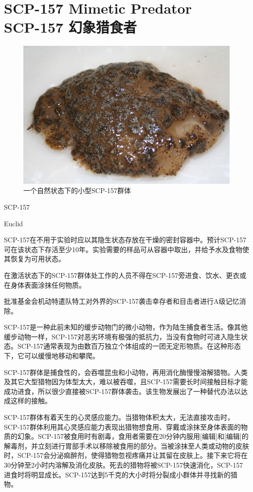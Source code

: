 \chapter[SCP-157 幻象猎食者]{
    SCP-157 Mimetic Predator\\
    SCP-157 幻象猎食者
}

\label{chap:SCP-157}

\begin{figure}[H]
    \centering
    \includegraphics[width=0.5\linewidth]{images/SCP.157.jpg}
    \caption*{一个自然状态下的小型SCP-157群体}
\end{figure}

SCP-157

Euclid

SCP-157在不用于实验时应以其隐生状态存放在干燥的密封容器中。预计SCP-157可在该状态下存活至少10年。实验需要的样品可从容器中取出，并给予水及食物使其恢复为可用状态。

在激活状态下的SCP-157群体处工作的人员不得在SCP-157旁进食、饮水、更衣或在身体表面涂抹任何物质。

批准基金会机动特遣队特工对外界的SCP-157袭击幸存者和目击者进行A级记忆消除。

SCP-157是一种此前未知的缓步动物门的微小动物，作为陆生捕食者生活。像其他缓步动物一样，SCP-157对恶劣环境有极强的抵抗力，当没有食物时可进入隐生状态。SCP-157通常表现为由数百万独立个体组成的一团无定形物质。在这种形态下，它可以缓慢地移动和攀爬。

SCP-157群体是捕食性的，会吞噬昆虫和小动物，再用消化酶慢慢溶解猎物。人类及其它大型猎物因为体型太大，难以被吞噬，且SCP-157需要长时间接触目标才能成功进食，所以很少直接被SCP-157群体袭击。该生物发展出了一种替代办法以达成这样的接触。

SCP-157群体有着天生的心灵感应能力。当猎物体积太大，无法直接攻击时，SCP-157群体利用其心灵感应能力表现出猎物想食用、穿戴或涂抹至身体表面的物质的幻象。SCP-157被食用时有剧毒，食用者需要在20分钟内服用{[}编辑]和{[}编辑]的解毒剂，并立刻进行胃部手术以移除被食用的部分。当被涂抹至人类或动物的皮肤时，SCP-157会分泌痲醉剂，使得猎物忽视疼痛并让其留在皮肤上。接下来它将在30分钟至2小时内溶解及消化皮肤。死去的猎物将被SCP-157快速消化，SCP-157进食时将明显成长。SCP-157达到5千克的大小时将分裂成小群体并寻找新的猎物。


